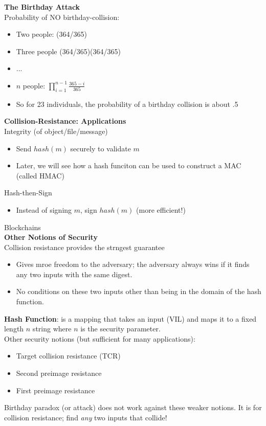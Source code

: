 \documentclass{article}
\begin{document}
\textbf{The Birthday Attack}\\
Probability of NO birthday-collision:\begin{itemize}
	\item Two people: (364/365)
	\item Three people (364/365)(364/365)
	\item ...
	\item $n$ people: $\prod^{n-1}_{i=1}\frac{365-i}{365}$
	\item So for 23 individuals, the probability of a birthday collision is about .5
\end{itemize}

\textbf{Collision-Resistance: Applications}\\
Integrity (of object/file/message)\begin{itemize}
	\item Send $hash(m)$ securely to validate $m$
	\item Later, we will see how a hash funciton can be used to construct a MAC (called HMAC)
\end{itemize}
Hash-then-Sign\begin{itemize}
	\item Instead of signing $m$, sign $hash(m)$ (more efficient!)
\end{itemize}
Blockchains\\

\textbf{Other Notions of Security}\\
Collision resistance provides the strngest guarantee\begin{itemize}
	\item Gives mroe freedom to the adversary; the adversary always wins if it finds any two inputs with the same digest.
	\item No conditions on these two inputs other than being in the domain of the hash function.
\end{itemize}
\textbf{Hash Function}: is a mapping that takes an input (VIL) and maps it to a fixed length $n$ string where $n$ is the security parameter.\\
Other security notions (but sufficient for many applications):\begin{itemize}
	\item Target collision resistance (TCR)
	\item Second preimage resistance
	\item First preimage resistance
\end{itemize}
Birthday paradox (or attack) does not work against these weaker notions. It is for collision resistance; find \textit{any} two inputs that collide!\\
\end{document}
